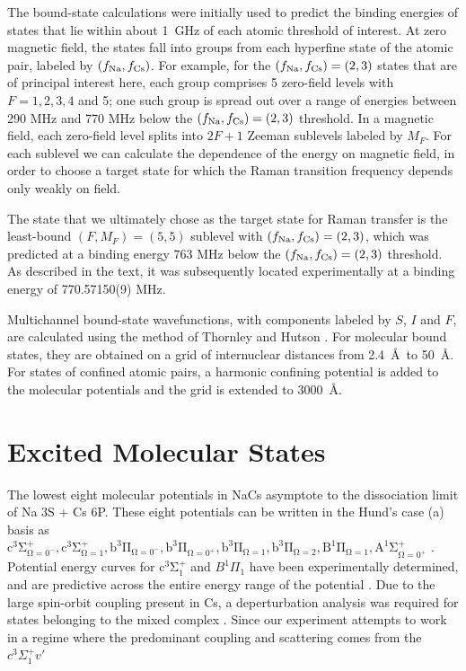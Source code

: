 \documentclass[aps,secnumarabic,amsmath,amssymb,10pt,superscriptaddress]{revtex4}
\begin{document}
The bound-state calculations were initially used to predict the binding energies of states that lie
within about 1~GHz of each atomic threshold of interest. At zero magnetic field, the states fall
into groups from each hyperfine state of the atomic pair, labeled by $(f_{\rm Na},f_{\rm Cs})$. For
example, for the $(f_{\rm Na},f_{\rm Cs}) = (2,3)$ states that are of principal interest here, each
group comprises 5 zero-field levels with $F=1,2,3,4$ and 5; one such group is spread out over a
range of energies between 290 MHz and 770 MHz below the $(f_{\rm Na},f_{\rm Cs}) = (2,3)$
threshold. In a magnetic field, each zero-field level splits into $2F+1$ Zeeman sublevels labeled
by $M_F$. For each sublevel we can calculate the dependence of the energy on magnetic field, in
order to choose a target state for which the Raman transition frequency depends only weakly on
field.

The state that we ultimately chose as the target state for Raman transfer is the least-bound
$(F,M_F)=(5,5)$ sublevel with $(f_{\rm Na},f_{\rm Cs}) = (2,3)$, which was predicted at a binding
energy 763 MHz below the $(f_{\rm Na},f_{\rm Cs}) = (2,3)$ threshold. As described in the text, it
was subsequently located experimentally at a binding energy of 770.57150(9) MHz.

Multichannel bound-state wavefunctions, with components labeled by $S$, $I$ and $F$, are calculated
using the method of Thornley and Hutson \cite{Thornley1994}. For molecular bound states, they are
obtained on a grid of internuclear distances from 2.4~\AA\ to 50~\AA. For states of confined atomic
pairs, a harmonic confining potential is added to the molecular potentials and the grid is extended
to 3000~\AA.

\section{Excited Molecular States} 
The lowest eight molecular potentials in NaCs asymptote to the dissociation limit of Na 3S + Cs 6P. These eight potentials can be written in the Hund's case (a) basis as $ \mathrm{c^3\Sigma^+_{\Omega = 0^-},c^3\Sigma^+_{\Omega = 1}, b^3\Pi_{\Omega = 0^-}, b^3\Pi_{\Omega = 0^+}, b^3\Pi_{\Omega = 1}, b^3\Pi_{\Omega = 2}, B^1\Pi_{\Omega = 1}, A^1\Sigma^+_{\Omega = 0^+}}$ \cite{Korek2007}. Potential energy curves for $\mathrm{c^3\Sigma^+_1}$ and $  B^1\Pi_1 $ have been experimentally determined, and are predictive across the entire energy range of the potential \cite{Grochola2010, Grochola2011, Liu2017}. Due to the large spin-orbit coupling present in Cs, a deperturbation analysis was required for states belonging to the mixed  complex \cite{Zaharova2009}. Since our experiment attempts to work in a regime where the predominant coupling and scattering comes from the $ c^3\Sigma^+_1 v'$
\end{document}
